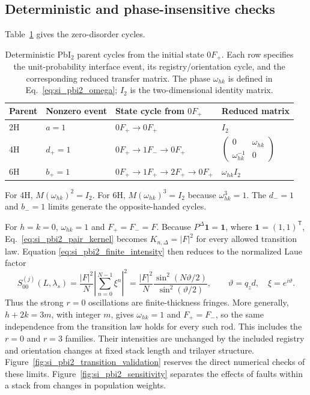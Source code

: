 \subsection{Deterministic and phase-insensitive checks}

Table~\ref{tab:si_parent_cycles} gives the zero-disorder cycles.
\begin{table}[!htbp]
\centering\small
\caption{Deterministic PbI$_2$ parent cycles from the initial state $0F_+$. Each row specifies the unit-probability interface event, its registry/orientation cycle, and the corresponding reduced transfer matrix. The phase $\omega_{hk}$ is defined in Eq.~\eqref{eq:si_pbi2_omega}; $I_2$ is the two-dimensional identity matrix.}
\label{tab:si_parent_cycles}
\begin{tabular}{llll}
\toprule
Parent & Nonzero event & State cycle from $0F_+$ & Reduced matrix\\
\midrule
2H & $a=1$ & $0F_+\rightarrow0F_+$ & $I_2$\\
4H & $d_+=1$ & $0F_+\rightarrow1F_-\rightarrow0F_+$ &
$\left(\begin{smallmatrix}0&\omega_{hk}\\\omega_{hk}^{-1}&0\end{smallmatrix}\right)$\\
6H & $b_+=1$ & $0F_+\rightarrow1F_+\rightarrow2F_+\rightarrow0F_+$ &
$\omega_{hk} I_2$\\
\bottomrule
\end{tabular}
\end{table}
\FloatBarrier
For 4H, $M(\omega_{hk})^2=I_2$. For 6H, $M(\omega_{hk})^3=I_2$ because
$\omega_{hk}^3=1$.  The $d_-=1$ and $b_-=1$ limits generate the opposite-handed
cycles.

For $h=k=0$, $\omega_{hk}=1$ and $F_+=F_-=F$.  Because $P^\Delta\mathbf 1=\mathbf 1$, where $\mathbf 1=(1,1)^{\mathsf T}$, Eq.~\eqref{eq:si_pbi2_pair_kernel} becomes
$K_{n,\Delta}=|F|^2$ for every allowed transition law.  Equation
\eqref{eq:si_pbi2_finite_intensity} then reduces to the normalized Laue factor
\begin{equation}
 S_{00}^{(j)}(L,\lambda_s)
 =\frac{|F|^2}{N}\left|\sum_{n=0}^{N-1}\xi^n\right|^2
 =\frac{|F|^2}{N}\frac{\sin^2(N\vartheta/2)}{\sin^2(\vartheta/2)},
 \qquad \vartheta=q_zd,\quad \xi=e^{i\vartheta}.
 \label{eq:si_pbi2_r0_laue}
\end{equation}
Thus the strong $r=0$ oscillations are finite-thickness fringes. More generally, $h+2k=3m$, with integer $m$, gives $\omega_{hk}=1$ and $F_+=F_-$, so the same independence from the transition law holds for every such rod. This includes the $r=0$ and $r=3$ families. Their intensities are unchanged by the included registry and orientation changes at fixed stack length and trilayer structure. Figure~\ref{fig:si_pbi2_transition_validation} reserves the direct numerical checks of these limits. Figure~\ref{fig:si_pbi2_sensitivity} separates the effects of faults within a stack from changes in population weights.


